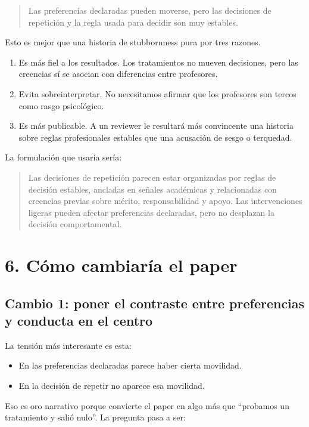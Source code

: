 \documentclass[12pt,a4paper]{article}
\begin{document}
\begin{quote}
Las preferencias declaradas pueden moverse, pero las decisiones de repetición y la regla usada para decidir son muy estables.
\end{quote}

Esto es mejor que una historia de stubbornness pura por tres razones.

\begin{enumerate}
  \item Es más fiel a los resultados. Los tratamientos no mueven decisiones, pero las creencias sí se asocian con diferencias entre profesores.
  \item Evita sobreinterpretar. No necesitamos afirmar que los profesores son tercos como rasgo psicológico.
  \item Es más publicable. A un reviewer le resultará más convincente una historia sobre reglas profesionales estables que una acusación de sesgo o terquedad.
\end{enumerate}

La formulación que usaría sería:

\begin{quote}
Las decisiones de repetición parecen estar organizadas por reglas de decisión estables, ancladas en señales académicas y relacionadas con creencias previas sobre mérito, responsabilidad y apoyo. Las intervenciones ligeras pueden afectar preferencias declaradas, pero no desplazan la decisión comportamental.
\end{quote}

\section*{6. Cómo cambiaría el paper}

\subsection*{Cambio 1: poner el contraste entre preferencias y conducta en el centro}

La tensión más interesante es esta:

\begin{itemize}
  \item En las preferencias declaradas parece haber cierta movilidad.
  \item En la decisión de repetir no aparece esa movilidad.
\end{itemize}

Eso es oro narrativo porque convierte el paper en algo más que ``probamos un tratamiento y salió nulo''. La pregunta pasa a ser:
\end{document}

